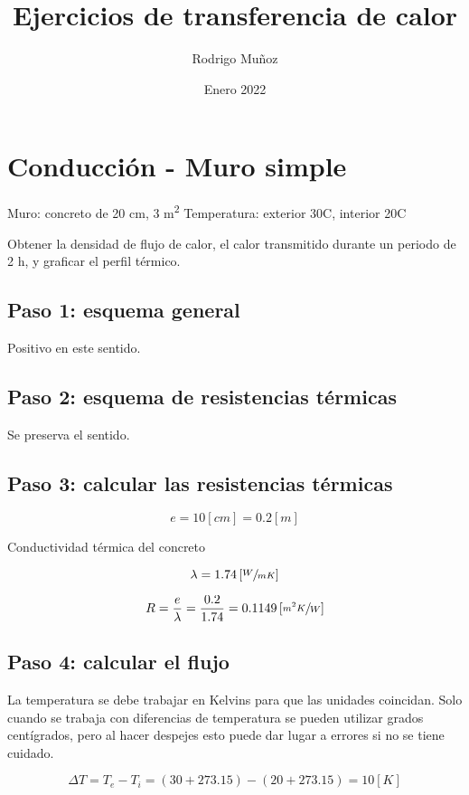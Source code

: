 \documentclass[11pt]{article}
\title{Ejercicios de transferencia de calor}
\author{Rodrigo Muñoz}
\date{Enero 2022}
\begin{document}
\maketitle

\section{Conducción - Muro simple}

Muro: concreto de 20 cm, 3 m\textsuperscript{2}
Temperatura: exterior 30\degree C, interior 20\degree C

Obtener la densidad de flujo de calor, el calor transmitido durante un periodo de 2 h, y graficar el perfil térmico.

\subsection{Paso 1: esquema general}

Positivo en este sentido.

\subsection{Paso 2: esquema de resistencias térmicas}

Se preserva el sentido.

\subsection{Paso 3: calcular las resistencias térmicas}

\[ e = 10 \left[ cm \right] = 0.2 \left[ m \right] \]

Conductividad térmica del concreto

\[ \lambda = 1.74 \left[ \sfrac{ W }{ m K } \right] \]

\[ R = \frac{ e }{ \lambda } = \frac{ 0.2 }{ 1.74 } = 0.1149 \left[ \sfrac{ m ^ 2 K }{ W } \right] \]

\subsection{Paso 4: calcular el flujo}

La temperatura se debe trabajar en Kelvins para que las unidades coincidan. Solo cuando se trabaja con diferencias de temperatura se pueden utilizar grados centígrados, pero al hacer despejes esto puede dar lugar a errores si no se tiene cuidado.

\[ \Delta T = T_e - T_i = \left( 30 + 273.15 \right) - \left( 20 + 273.15 \right) = 10 \left[ K \right] \]
\end{document}
